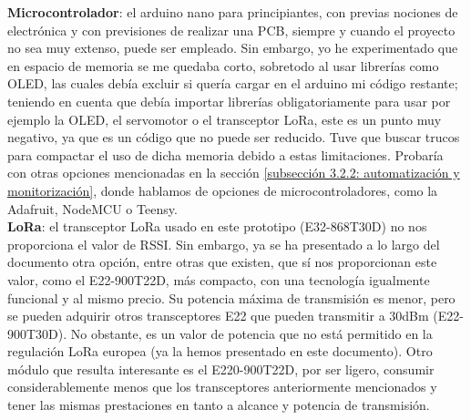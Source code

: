 \documentclass[12pt]{article}
\begin{document}
		
	
	
	
	\noindent \textbf{Microcontrolador}: el arduino nano para principiantes, con previas nociones de electrónica y con previsiones de realizar una PCB, siempre y cuando el proyecto no sea muy extenso, puede ser empleado. Sin embargo, yo he experimentado que en espacio de memoria se me quedaba corto, sobretodo al usar librerías como OLED, las cuales debía excluir si quería cargar en el arduino mi código restante; teniendo en cuenta que debía importar librerías obligatoriamente para usar por ejemplo la OLED, el servomotor o el transceptor LoRa, este es un punto muy negativo, ya que es un código que no puede ser reducido. Tuve que buscar trucos para compactar el uso de dicha memoria debido a estas limitaciones. Probaría con otras opciones mencionadas en la sección \ref{subsección 3.2.2: automatización y monitorización}, donde hablamos de opciones de microcontroladores, como la Adafruit, NodeMCU o Teensy. \\
	
	\noindent \textbf{LoRa}: el transceptor LoRa usado en este prototipo (E32-868T30D) no nos proporciona el valor de RSSI. Sin embargo, ya se ha presentado a lo largo del documento otra opción, entre otras que existen, que sí nos proporcionan este valor, como el E22-900T22D, más compacto, con una tecnología igualmente funcional y al mismo precio. Su potencia máxima de transmisión es menor, pero se pueden adquirir otros transceptores E22 que pueden transmitir a 30dBm (E22-900T30D). No obstante, es un valor de potencia que no está permitido en la regulación LoRa europea (ya la hemos presentado en este documento). Otro módulo que resulta interesante es el E220-900T22D, por ser ligero, consumir considerablemente menos que los transceptores anteriormente mencionados y tener las mismas prestaciones en tanto a alcance y potencia de transmisión.\\
	
\end{document}
